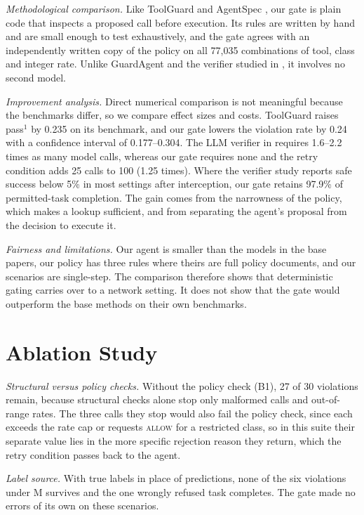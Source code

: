 \documentclass[11pt,a4paper]{article}
\begin{document}
\textit{Methodological comparison.} Like ToolGuard \cite{zwerdling2025} and AgentSpec \cite{wang2026agentspec}, our gate is plain code that inspects a proposed call before execution. Its rules are written by hand and are small enough to test exhaustively, and the gate agrees with an independently written copy of the policy on all 77,035 combinations of tool, class and integer rate. Unlike GuardAgent \cite{xiang2025guardagent} and the verifier studied in \cite{sah2026verifier}, it involves no second model.

\textit{Improvement analysis.} Direct numerical comparison is not meaningful because the benchmarks differ, so we compare effect sizes and costs. ToolGuard raises pass$^1$ by 0.235 on its benchmark, and our gate lowers the violation rate by 0.24 with a confidence interval of 0.177--0.304. The LLM verifier in \cite{sah2026verifier} requires 1.6--2.2 times as many model calls, whereas our gate requires none and the retry condition adds 25 calls to 100 (1.25 times). Where the verifier study reports safe success below 5\% in most settings after interception, our gate retains 97.9\% of permitted-task completion. The gain comes from the narrowness of the policy, which makes a lookup sufficient, and from separating the agent's proposal from the decision to execute it.

\textit{Fairness and limitations.} Our agent is smaller than the models in the base papers, our policy has three rules where theirs are full policy documents, and our scenarios are single-step. The comparison therefore shows that deterministic gating carries over to a network setting. It does not show that the gate would outperform the base methods on their own benchmarks.

\section{Ablation Study}

\textit{Structural versus policy checks.} Without the policy check (B1), 27 of 30 violations remain, because structural checks alone stop only malformed calls and out-of-range rates. The three calls they stop would also fail the policy check, since each exceeds the rate cap or requests \textsc{allow} for a restricted class, so in this suite their separate value lies in the more specific rejection reason they return, which the retry condition passes back to the agent.

\textit{Label source.} With true labels in place of predictions, none of the six violations under M survives and the one wrongly refused task completes. The gate made no errors of its own on these scenarios.
\end{document}
